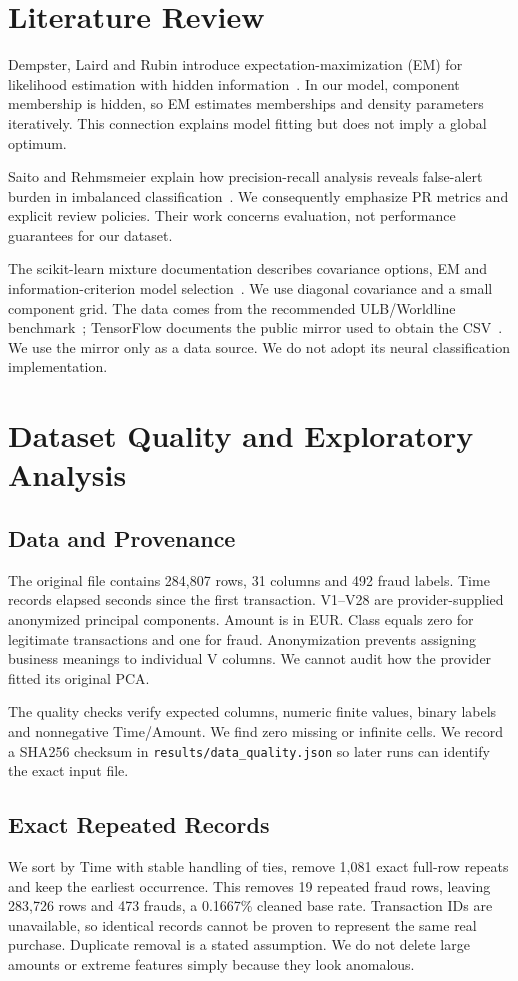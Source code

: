 \documentclass[conference]{IEEEtran}
\begin{document}
\section{Literature Review}
Dempster, Laird and Rubin introduce expectation-maximization (EM) for likelihood estimation with hidden information~\cite{em}. In our model, component membership is hidden, so EM estimates memberships and density parameters iteratively. This connection explains model fitting but does not imply a global optimum.

Saito and Rehmsmeier explain how precision-recall analysis reveals false-alert burden in imbalanced classification~\cite{pr}. We consequently emphasize PR metrics and explicit review policies. Their work concerns evaluation, not performance guarantees for our dataset.

The scikit-learn mixture documentation describes covariance options, EM and information-criterion model selection~\cite{sklearn}. We use diagonal covariance and a small component grid. The data comes from the recommended ULB/Worldline benchmark~\cite{data}; TensorFlow documents the public mirror used to obtain the CSV~\cite{tf}. We use the mirror only as a data source. We do not adopt its neural classification implementation.

\section{Dataset Quality and Exploratory Analysis}
\subsection{Data and Provenance}
The original file contains 284,807 rows, 31 columns and 492 fraud labels. Time records elapsed seconds since the first transaction. V1--V28 are provider-supplied anonymized principal components. Amount is in EUR. Class equals zero for legitimate transactions and one for fraud. Anonymization prevents assigning business meanings to individual V columns. We cannot audit how the provider fitted its original PCA.

The quality checks verify expected columns, numeric finite values, binary labels and nonnegative Time/Amount. We find zero missing or infinite cells. We record a SHA256 checksum in \texttt{results/data\_quality.json} so later runs can identify the exact input file.

\subsection{Exact Repeated Records}
We sort by Time with stable handling of ties, remove 1,081 exact full-row repeats and keep the earliest occurrence. This removes 19 repeated fraud rows, leaving 283,726 rows and 473 frauds, a 0.1667\% cleaned base rate. Transaction IDs are unavailable, so identical records cannot be proven to represent the same real purchase. Duplicate removal is a stated assumption. We do not delete large amounts or extreme features simply because they look anomalous.
\end{document}
